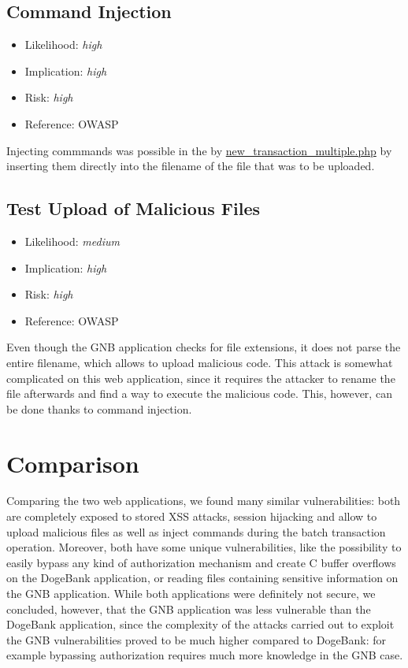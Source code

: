 \subsection{Command Injection} \label{over:command_injection}
\begin{itemize}
	\item Likelihood: \textit{high}
	\item Implication: \textit{high}
	\item Risk: \textit{high}
	\item Reference: OWASP 
\end{itemize}
Injecting commmands was possible in the by \url{new\_transaction\_multiple.php} by inserting them directly into the filename of the file that was to be uploaded.

\subsection{Test Upload of Malicious Files} \label{over:maliciousgnb}
\begin{itemize}
	\item Likelihood: \textit{medium}
	\item Implication: \textit{high}
	\item Risk: \textit{high}
	\item Reference: OWASP 
\end{itemize}
Even though the GNB application checks for file extensions, it does not parse the entire filename, which allows to upload malicious code. This attack is somewhat complicated on this web application, since it requires the attacker to rename the file afterwards and find a way to execute the malicious code. This, however, can be done thanks to command injection.
	
\section{Comparison}
Comparing the two web applications, we found many similar vulnerabilities: both are completely exposed to stored XSS attacks, session hijacking and allow to upload malicious files as well as inject commands during the batch transaction operation.\newline
Moreover, both have some unique vulnerabilities, like the possibility to easily bypass any kind of authorization mechanism and create C buffer overflows on the DogeBank application, or reading files containing sensitive information on the GNB application.\newline
While both applications were definitely not secure, we concluded, however, that the GNB application was less vulnerable than the DogeBank application, since the complexity of the attacks carried out to exploit the GNB vulnerabilities proved to be much higher compared to DogeBank: for example bypassing authorization requires much more knowledge in the GNB case.